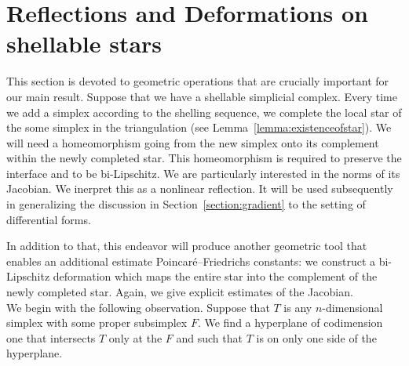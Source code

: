 \documentclass[10pt,letterpaper]{article}
\begin{document}
\section{Reflections and Deformations on shellable stars}\label{section:extension}

This section is devoted to geometric operations that are crucially important for our main result. 
Suppose that we have a shellable simplicial complex. 
Every time we add a simplex according to the shelling sequence, 
we complete the local star of the some simplex in the triangulation (see Lemma~\ref{lemma:existenceofstar}).
We will need a homeomorphism going from the new simplex onto its complement within the newly completed star.
This homeomorphism is required to preserve the interface and to be bi-Lipschitz.
We are particularly interested in the norms of its Jacobian.
We inerpret this as a nonlinear reflection. It will be used subsequently in generalizing the discussion in Section~\ref{section:gradient} to the setting of differential forms. 

In addition to that, this endeavor will produce another geometric tool 
that enables an additional estimate Poincar\'e--Friedrichs constants:
we construct a bi-Lipschitz deformation which maps the entire star 
into the complement of the newly completed star. 
Again, we give explicit estimates of the Jacobian.
\\



We begin with the following observation. 
Suppose that $T$ is any $n$-dimensional simplex with some proper subsimplex $F$.
We find a hyperplane of codimension one that intersects $T$ only at the $F$ and such that $T$ is on only one side of the hyperplane. 
\end{document}
